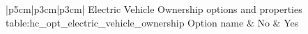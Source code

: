 \begin{customLongTable}{ |p{5cm}|p{3cm}|p{3cm}| }
{Electric Vehicle Ownership options and properties} {table:hc_opt_electric_vehicle_ownership}
{Option name & No & Yes}
\endhead
\hline
\end{customLongTable}
